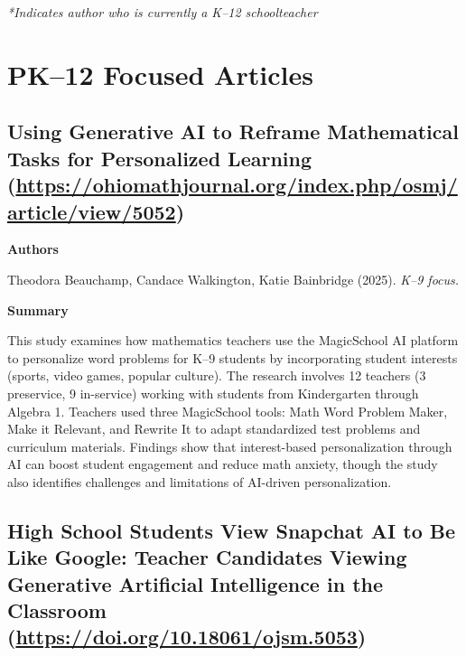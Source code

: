 \documentclass[11pt, a4paper]{article}
\newenvironment{annotation}[1]
{\par\vspace{2pt}\noindent\textbf{#1}\par\vspace{1pt}\noindent\small\ignorespaces}
{\par\vspace{3pt}}
\begin{document}
\noindent\textit{*Indicates author who is currently a K--12 schoolteacher}

\vspace{1em}

\section{PK--12 Focused Articles}

\subsection[\texorpdfstring{Using Generative AI to Reframe Mathematical Tasks for Personalized Learning }{Using Generative AI to Reframe Mathematical Tasks for Personalized Learning }]{Using Generative AI to Reframe Mathematical Tasks for Personalized Learning (\texorpdfstring{\url{https://ohiomathjournal.org/index.php/osmj/article/view/5052}}{})}

\begin{annotation}{Authors}
Theodora Beauchamp, Candace Walkington, Katie Bainbridge (2025). \textit{K--9 focus.}
\end{annotation}

\begin{annotation}{Summary}
This study examines how mathematics teachers use the MagicSchool AI platform to personalize word problems for K--9 students by incorporating student interests (sports, video games, popular culture). The research involves 12 teachers (3 preservice, 9 in-service) working with students from Kindergarten through Algebra 1. Teachers used three MagicSchool tools: Math Word Problem Maker, Make it Relevant, and Rewrite It to adapt standardized test problems and curriculum materials. Findings show that interest-based personalization through AI can boost student engagement and reduce math anxiety, though the study also identifies challenges and limitations of AI-driven personalization.
\end{annotation}

\subsection[\texorpdfstring{High School Students View Snapchat AI to Be Like Google: Teacher Candidates Viewing Generative Artificial Intelligence in the Classroom }{High School Students View Snapchat AI to Be Like Google: Teacher Candidates Viewing Generative Artificial Intelligence in the Classroom }]{High School Students View Snapchat AI to Be Like Google: Teacher Candidates Viewing Generative Artificial Intelligence in the Classroom (\texorpdfstring{\url{https://doi.org/10.18061/ojsm.5053}}{})}
\end{document}
